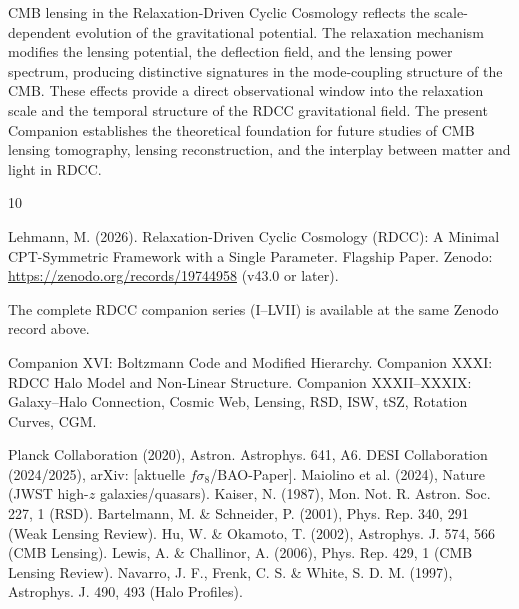 \documentclass[11pt,a4paper]{article}
\begin{document}
CMB lensing in the Relaxation-Driven Cyclic Cosmology reflects the scale-dependent 
evolution of the gravitational potential. The relaxation mechanism modifies the 
lensing potential, the deflection field, and the lensing power spectrum, producing 
distinctive signatures in the mode-coupling structure of the CMB. These effects 
provide a direct observational window into the relaxation scale and the temporal 
structure of the RDCC gravitational field. The present Companion establishes the 
theoretical foundation for future studies of CMB lensing tomography, lensing 
reconstruction, and the interplay between matter and light in RDCC.


\begin{thebibliography}{10}

 Lehmann, M. (2026). Relaxation-Driven Cyclic Cosmology (RDCC): A Minimal CPT-Symmetric Framework with a Single Parameter. Flagship Paper. Zenodo: \url{https://zenodo.org/records/19744958} (v43.0 or later).

 The complete RDCC companion series (I--LVII) is available at the same Zenodo record above.

 Companion XVI: Boltzmann Code and Modified Hierarchy.
 Companion XXXI: RDCC Halo Model and Non-Linear Structure.
 Companion XXXII--XXXIX: Galaxy--Halo Connection, Cosmic Web, Lensing, RSD, ISW, tSZ, Rotation Curves, CGM.

 Planck Collaboration (2020), Astron. Astrophys. 641, A6.
 DESI Collaboration (2024/2025), arXiv: [aktuelle $f\sigma_8$/BAO-Paper].
 Maiolino et al. (2024), Nature (JWST high-$z$ galaxies/quasars).
 Kaiser, N. (1987), Mon. Not. R. Astron. Soc. 227, 1 (RSD).
 Bartelmann, M. \& Schneider, P. (2001), Phys. Rep. 340, 291 (Weak Lensing Review).
 Hu, W. \& Okamoto, T. (2002), Astrophys. J. 574, 566 (CMB Lensing).
 Lewis, A. \& Challinor, A. (2006), Phys. Rep. 429, 1 (CMB Lensing Review).
 Navarro, J. F., Frenk, C. S. \& White, S. D. M. (1997), Astrophys. J. 490, 493 (Halo Profiles).

\end{thebibliography}
\end{document}
